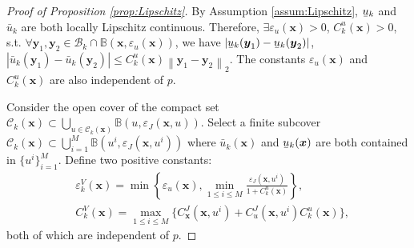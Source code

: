 \documentclass[journal]{IEEEtran}
\theoremstyle{definition}
\theoremstyle{definition}
\newcommand\norm[2][1]{\left\|#2\right\|_{#1}}
\newcommand\abs[1]{\left|#1\right|}
\renewcommand\vector[1]{\boldsymbol{#1}}
\newcommand\vx{{\vector{x}}}
\newcommand\vy{{\vector{y}}}
\DeclareRobustCommand{\underbar}[1]{\kern0.3\fontdimen2\font\underaccent{\bar}{\kern-0.3\fontdimen2\font #1}}
\begin{document}
\begin{proof}[Proof of Proposition \ref{prop:Lipschitz}]
    By Assumption \ref{assum:Lipschitz}, $\underbar{u}_k$ and $\bar{u}_k$ are both locally Lipschitz continuous. Therefore, $\exists \varepsilon_u(\vx)>0$, $C_k^u(\vx)>0$, s.t. $\forall \vy_1,\vy_2\in\mathcal{B}_k\cap\mathbb{B}(\vx,\varepsilon_u(\vx))$, we have $\abs{\underbar{u}_k(\vy_1)-\underbar{u}_k(\vy_2)}$, $\abs{\bar{u}_k(\vy_1)-\bar{u}_k(\vy_2)}\leq C_k^u(\vx)\norm[2]{\vy_1-\vy_2}$. The constants $\varepsilon_u(\vx)$ and $C_k^u(\vx)$ are also independent of $p$.

    Consider the open cover of the compact set $\mathcal{C}_k(\vx)\subset\bigcup_{u\in\mathcal{C}_k(\vx)}\mathbb{B}(u,\varepsilon_J(\vx,u))$. Select a finite subcover $\mathcal{C}_k(\vx)\subset\bigcup_{i=1}^M\mathbb{B}(u^i,\varepsilon_J(\vx,u^i))$ where $\bar{u}_k(\vx)$ and $\underbar{u}_k(\vx)$ are both contained in $\{u^i\}_{i=1}^M$. Define two positive constants:
    \begin{subequations}
        \begin{align}
            &\varepsilon_k^V(\vx)=\min\left\{\varepsilon_u(\vx), \min_{1\leq i\leq M}\frac{\varepsilon_J(\vx,u^i)}{1+C_k^u(\vx)}\right\},\\
            &C_k^V(\vx)=\max_{1\leq i\leq M}\Big\{C_{\vx}^J(\vx,u^i)+C_{u}^J(\vx,u^i)C_k^u(\vx)\Big\},
        \end{align}
    \end{subequations}
    both of which are independent of $p$. 


\end{proof}
\end{document}
